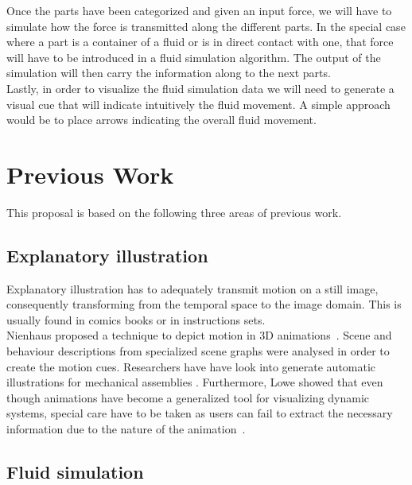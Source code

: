 \documentclass[11pt]{report}
\begin{document}
Once the parts have been categorized and given an input force, we will have to simulate how the force is transmitted along the different parts.
In the special case where a part is a container of a fluid or is in direct contact with one, that force will have to be introduced in a fluid simulation algorithm.
The output of the simulation will then carry the information along to the next parts.\\

Lastly, in order to visualize the fluid simulation data we will need to generate a visual cue that will indicate intuitively the fluid movement.
A simple approach would be to place arrows indicating the overall fluid movement.

\section{Previous Work}

This proposal is based on the following three areas of previous work.

\subsection{Explanatory illustration}

Explanatory illustration has to adequately transmit motion on a still image, consequently transforming from the temporal space to the image domain.
This is usually found in comics books or in instructions sets.\\

Nienhaus proposed a technique to depict motion in 3D animations~\cite{Nienhaus2005}.
Scene and behaviour descriptions from specialized scene graphs were analysed in order to create the motion cues.  
Researchers have have look into generate automatic illustrations for mechanical assemblies \cite{Mitra2010}.
Furthermore, Lowe showed that even though animations have become a generalized tool for visualizing dynamic systems, special care have to be taken as users can fail to extract the necessary information due to the nature of the animation~\cite{Lowe2014}.


\subsection{Fluid simulation}
\label{prevWorkFluidSim}
\end{document}
